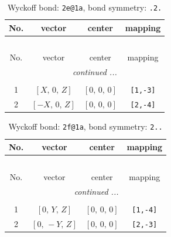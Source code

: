 \documentclass[fleqn,8pt]{jsarticle}
\begin{document}
\begin{longtable}{cccc}
\caption{Wyckoff bond: {\tt 2e@1a}, bond symmetry: {\tt .2.}}
 \\
 \hline \hline
No. & vector & center & mapping \\ \hline \endfirsthead

\multicolumn{3}{l}{\tablename\ \thetable{}} \\
 \hline \hline
No. & vector & center & mapping \\ \hline \endhead

 \hline \hline
\multicolumn{3}{r}{\footnotesize\it continued ...} \\ \endfoot

 \hline \hline
\multicolumn{3}{r}{} \\ \endlastfoot

1 & $\left[ X,\, 0,\, Z \right]$ & $\left[ 0,\, 0,\, 0 \right]$ & {\tt [1,-3]} \\ \hline
2 & $\left[ - X,\, 0,\, Z \right]$ & $\left[ 0,\, 0,\, 0 \right]$ & {\tt [2,-4]} \\
\end{longtable}
\renewcommand{\arraystretch}{1.2}
\begin{longtable}{cccc}
\caption{Wyckoff bond: {\tt 2f@1a}, bond symmetry: {\tt 2..}}
 \\
 \hline \hline
No. & vector & center & mapping \\ \hline \endfirsthead

\multicolumn{3}{l}{\tablename\ \thetable{}} \\
 \hline \hline
No. & vector & center & mapping \\ \hline \endhead

 \hline \hline
\multicolumn{3}{r}{\footnotesize\it continued ...} \\ \endfoot

 \hline \hline
\multicolumn{3}{r}{} \\ \endlastfoot

1 & $\left[ 0,\, Y,\, Z \right]$ & $\left[ 0,\, 0,\, 0 \right]$ & {\tt [1,-4]} \\ \hline
2 & $\left[ 0,\, - Y,\, Z \right]$ & $\left[ 0,\, 0,\, 0 \right]$ & {\tt [2,-3]} \\
\end{longtable}
\renewcommand{\arraystretch}{1.2}
\end{document}

